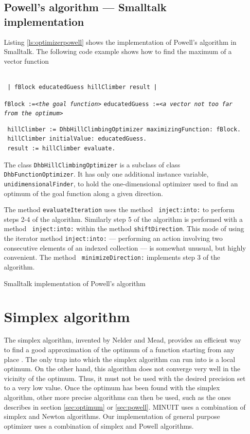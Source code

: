 \documentclass[twoside]{book}
\begin{document}
\subsection{Powell's algorithm --- Smalltalk implementation}
 Listing \ref{ls:optimizerpowell}
shows the implementation of Powell's algorithm in Smalltalk. The
following code example shows how to find the maximum of a vector
function
\begin{codeExample}
\label{ex:spowell}
\begin{verbatim}

 | fBlock educatedGuess hillClimber result |
\end{verbatim}
 {\tt fBlock :=<\sl the goal function\tt >}\hfil\break
 {\tt educatedGuess :=<\sl a vector not too far from the optimum\tt >}
\begin{verbatim}
 hillClimber := DhbHillClimbingOptimizer maximizingFunction: fBlock.
 hillClimber initialValue: educatedGuess.
 result := hillClimber evaluate.
\end{verbatim}
\end{codeExample}
The class {\tt DhbHillClimbingOptimizer} is a subclass of class
{\tt DhbFunctionOptimizer}. It has only one additional instance
variable, {\tt unidimensionalFinder}, to hold the one-dimensional
optimizer used to find an optimum of the goal function along a
given direction.

The method {\tt evaluateIteration} uses the method {\tt
inject:into:} to perform steps 2-4 of the algorithm. Similarly
step 5 of the algorithm is performed with a method {\tt
inject:into:} within the method {\tt shiftDirection}. This mode of
using the iterator method {\tt inject:into:} --- performing an
action involving two consecutive elements of an indexed collection
--- is somewhat unusual, but highly convenient\cite{Beck}. The method {\tt
minimizeDirection:} implements step 3 of the algorithm.

\begin{listing} Smalltalk implementation of Powell's algorithm
\label{ls:optimizerpowell}

\end{listing}

\section{Simplex algorithm}
\label{sec:simplex} The simplex algorithm, invented by Nelder and
Mead, provides an efficient way to find a good approximation of
the optimum of a function starting from any place \cite{Press}.
The only trap into which the simplex algorithm can run into is a
local optimum. On the other hand, this algorithm does not converge
very well in the vicinity of the optimum. Thus, it must not be
used with the desired precision set to a very low value. Once the
optimum has been found with the simplex algorithm, other more
precise algorithms can then be used, such as the ones describes in
section \ref{sec:optimum} or \ref{sec:powell}. MINUIT uses a
combination of simplex and Newton algorithms. Our implementation
of general purpose optimizer uses a combination of simplex and
Powell algorithms.
\end{document}
